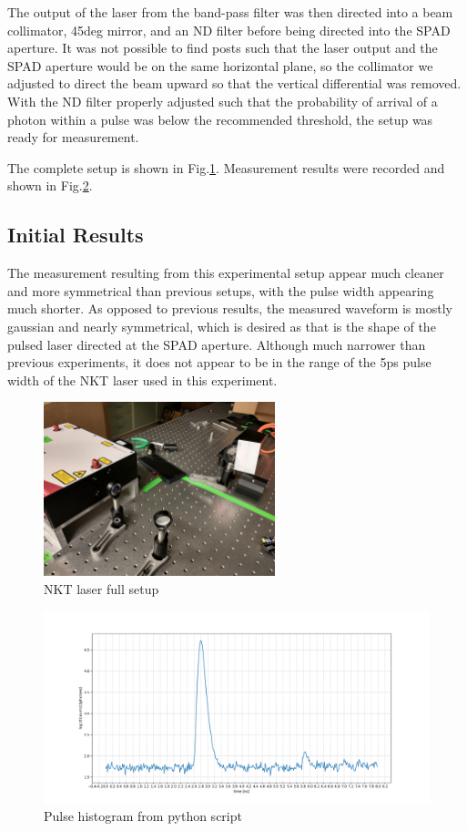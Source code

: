 \documentclass[a4paper]{article}
\begin{document}
The output of the laser from the band-pass filter was then directed into a beam collimator, 45deg mirror, and an ND filter before being directed into the SPAD aperture. It was not possible to find posts such that the laser output and the SPAD aperture would be on the same horizontal plane, so the collimator we adjusted to direct the beam upward so that the vertical differential was removed. With the ND filter properly adjusted such that the probability of arrival of a photon within a pulse was below the recommended threshold, the setup was ready for measurement.

The complete setup is shown in Fig.\ref{fig:nkt_same_table}.
Measurement results were recorded and shown in Fig.\ref{fig:python_graph}.

\subsection{Initial Results}

The measurement resulting from this experimental setup appear much cleaner and more symmetrical than previous setups, with the pulse width appearing much shorter. As opposed to previous results, the measured waveform is mostly gaussian and nearly symmetrical, which is desired as that is the shape of the pulsed laser directed at the SPAD aperture. Although much narrower than previous experiments, it does not appear to be in the range of the 5ps pulse width of the NKT laser used in this experiment.

\begin{figure}
\centering
\includegraphics[width=0.6\textwidth]{figures/IMG_20220422_142651049_HDR.jpg}
\caption{\label{fig:nkt_same_table}NKT laser full setup}
\end{figure}

\begin{figure}
\centering
\includegraphics[width=1.0\textwidth]{figures/python_pulse_graph.png}
\caption{\label{fig:python_graph}Pulse histogram from python script}
\end{figure}
\end{document}
